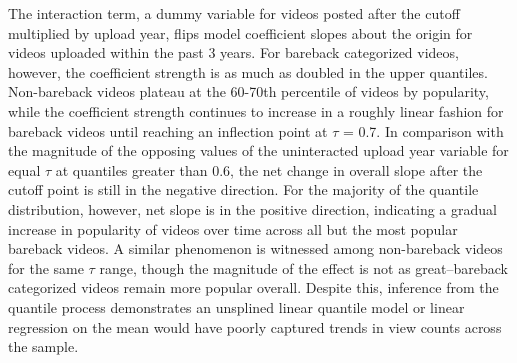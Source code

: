 \documentclass[]{article}
\begin{document}
The interaction term, a dummy variable for videos posted after the
cutoff multiplied by upload year, flips model coefficient slopes about
the origin for videos uploaded within the past 3 years. For bareback
categorized videos, however, the coefficient strength is as much as
doubled in the upper quantiles. Non-bareback videos plateau at the
60-70th percentile of videos by popularity, while the coefficient
strength continues to increase in a roughly linear fashion for bareback
videos until reaching an inflection point at \(\tau\) = 0.7. In
comparison with the magnitude of the opposing values of the uninteracted
upload year variable for equal \(\tau\) at quantiles greater than 0.6,
the net change in overall slope after the cutoff point is still in the
negative direction. For the majority of the quantile distribution,
however, net slope is in the positive direction, indicating a gradual
increase in popularity of videos over time across all but the most
popular bareback videos. A similar phenomenon is witnessed among
non-bareback videos for the same \(\tau\) range, though the magnitude of
the effect is not as great--bareback categorized videos remain more
popular overall. Despite this, inference from the quantile process
demonstrates an unsplined linear quantile model or linear regression on
the mean would have poorly captured trends in view counts across the
sample.
\end{document}

